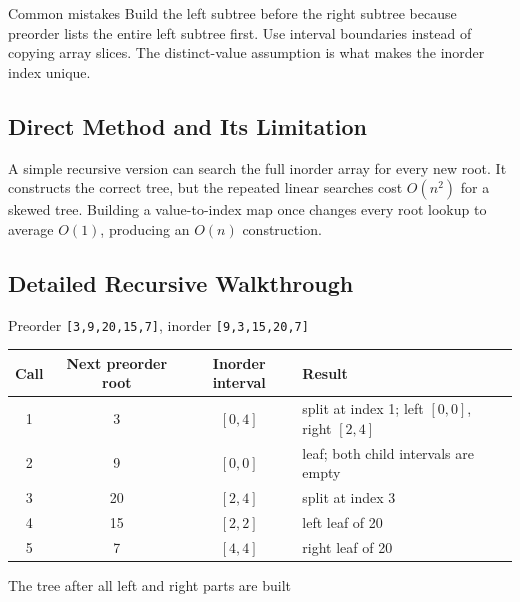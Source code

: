 \begin{revisionbox}{Common mistakes}
Build the left subtree before the right subtree because preorder lists the
entire left subtree first. Use interval boundaries instead of copying array
slices. The distinct-value assumption is what makes the inorder index unique.
\end{revisionbox}

\subsection{Direct Method and Its Limitation}
A simple recursive version can search the full inorder array for every new
root. It constructs the correct tree, but the repeated linear searches cost
\(O(n^2)\) for a skewed tree. Building a value-to-index map once changes every
root lookup to average \(O(1)\), producing an \(O(n)\) construction.

\subsection{Detailed Recursive Walkthrough}
\begin{dryrunbox}{Preorder \texttt{[3,9,20,15,7]}, inorder \texttt{[9,3,15,20,7]}}
\begin{center}
\begin{tabularx}{\linewidth}{@{}c c c X@{}}
\toprule
Call & Next preorder root & Inorder interval & Result \\
\midrule
1 & 3 & \([0,4]\) & split at index 1; left \([0,0]\), right \([2,4]\) \\
2 & 9 & \([0,0]\) & leaf; both child intervals are empty \\
3 & 20 & \([2,4]\) & split at index 3 \\
4 & 15 & \([2,2]\) & left leaf of 20 \\
5 & 7 & \([4,4]\) & right leaf of 20 \\
\bottomrule
\end{tabularx}
\end{center}
\end{dryrunbox}

\begin{visualbox}{The tree after all left and right parts are built}
\centering
{}
\end{visualbox}


